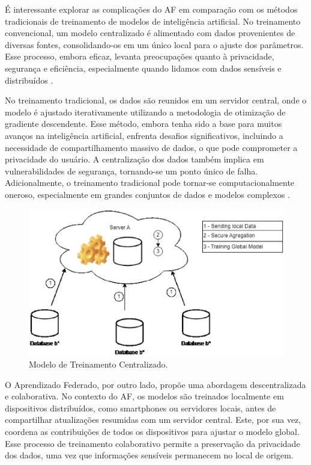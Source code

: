 É interessante explorar as complicações do AF em comparação com os métodos tradicionais de treinamento de modelos de inteligência artificial. No treinamento convencional, um modelo centralizado é alimentado com dados provenientes de diversas fontes, consolidando-os em um único local para o ajuste dos parâmetros. Esse processo, embora eficaz, levanta preocupações quanto à privacidade, segurança e eficiência, especialmente quando lidamos com dados sensíveis e distribuídos \cite{goodfellow2016deep}.

No treinamento tradicional, os dados são reunidos em um servidor central, onde o modelo é ajustado iterativamente utilizando a metodologia de otimização de gradiente descendente. Esse método, embora tenha sido a base para muitos avanços na inteligência artificial, enfrenta desafios significativos, incluindo a necessidade de compartilhamento massivo de dados, o que pode comprometer a privacidade do usuário. A centralização dos dados também implica em vulnerabilidades de segurança, tornando-se um ponto único de falha. Adicionalmente, o treinamento tradicional pode tornar-se computacionalmente oneroso, especialmente em grandes conjuntos de dados e modelos complexos \cite{sutskever2013importance}.

\begin{figure}[ht]
    \centering
    \includegraphics[scale=0.50]{figuras/teorica/centralizedDiagram.eps}
    \caption{Modelo de Treinamento Centralizado.}
    \label{fig:TraditionalCentralizedLearning}
\end{figure}

O Aprendizado Federado, por outro lado, propõe uma abordagem descentralizada e colaborativa. No contexto do AF, os modelos são treinados localmente em dispositivos distribuídos, como smartphones ou servidores locais, antes de compartilhar atualizações resumidas com um servidor central. Este, por sua vez, coordena as contribuições de todos os dispositivos para ajustar o modelo global. Esse processo de treinamento colaborativo permite a preservação da privacidade dos dados, uma vez que informações sensíveis permanecem no local de origem\cite{mcmahan2017communication}.

